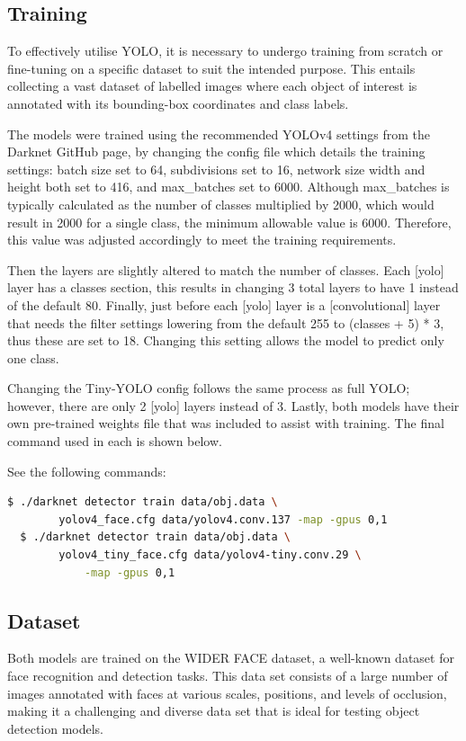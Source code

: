 \subsection{Training}

To effectively utilise YOLO, it is necessary to undergo training from scratch or fine-tuning on a specific dataset to suit the intended purpose. This entails collecting a vast dataset of labelled images where each object of interest is annotated with its bounding-box coordinates and class labels.

The models were trained using the recommended YOLOv4 settings from the Darknet GitHub page, by changing the config file which details the training settings: batch size set to 64, subdivisions set to 16, network size width and height both set to 416, and max\_batches set to 6000. Although max\_batches is typically calculated as the number of classes multiplied by 2000, which would result in 2000 for a single class, the minimum allowable value is 6000. Therefore, this value was adjusted accordingly to meet the training requirements.

Then the layers are slightly altered to match the number of classes. Each [yolo] layer has a classes section, this results in changing 3 total layers to have 1 instead of the default 80. Finally, just before each [yolo] layer is a [convolutional] layer that needs the filter settings lowering from the default 255 to (classes + 5) * 3, thus these are set to 18. Changing this setting allows the model to predict only one class.

Changing the Tiny-YOLO config follows the same process as full YOLO; however, there are only 2 [yolo] layers instead of 3. Lastly, both models have their own pre-trained weights file that was included to assist with training. The final command used in each is shown below.

\noindent{} See the following commands:
\begin{lstlisting}[language=bash]
  $ ./darknet detector train data/obj.data \
        yolov4_face.cfg data/yolov4.conv.137 -map -gpus 0,1
  $ ./darknet detector train data/obj.data \
        yolov4_tiny_face.cfg data/yolov4-tiny.conv.29 \
            -map -gpus 0,1
\end{lstlisting}


\subsection{Dataset}

Both models are trained on the WIDER FACE \cite{yang2016wider} dataset, a well-known dataset for face recognition and detection tasks. This data set consists of a large number of images annotated with faces at various scales, positions, and levels of occlusion, making it a challenging and diverse data set that is ideal for testing object detection models.

